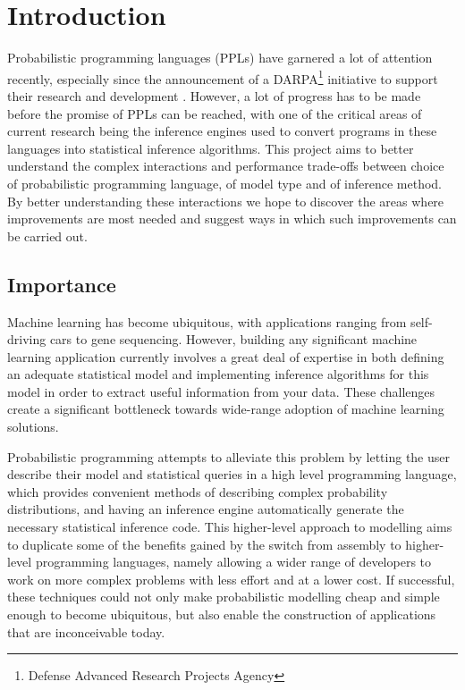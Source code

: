 \chapter{Introduction}

\setcounter{page}{1} 

Probabilistic programming languages (PPLs) have garnered a lot of attention recently, especially since the announcement of a DARPA\footnote{Defense Advanced Research Projects Agency} initiative to support their research and development \cite{ppaml}. However, a lot of progress has to be made before the promise of PPLs can be reached, with one of the critical areas of current research being the inference engines used to convert programs in these languages into statistical inference algorithms. This project aims to better understand the complex interactions and performance trade-offs between choice of probabilistic programming language, of model type and of inference method. By better understanding these interactions we hope to discover the areas where improvements are most needed and suggest ways in which such improvements can be carried out.

\section{Importance}
\label{sect:importance}
Machine learning has become ubiquitous, with applications ranging from self-driving cars to gene sequencing. However, building any significant machine learning application currently involves a great deal of expertise in both defining an adequate statistical model and implementing inference algorithms for this model in order to extract useful information from your data. These challenges create a significant bottleneck towards wide-range adoption of machine learning solutions.

Probabilistic programming attempts to alleviate this problem by letting the user describe their model and statistical queries in a high level programming language, which provides convenient methods of
describing complex probability distributions, and having an inference engine automatically generate the necessary statistical inference code. This higher-level approach to modelling aims to duplicate some of the benefits gained by the switch from assembly to higher-level programming languages, namely allowing a wider range of developers to work on more complex problems with less effort and at a lower cost. If successful, these techniques could not only make probabilistic modelling cheap and simple enough to become ubiquitous, but also enable the construction of applications that are inconceivable today.

